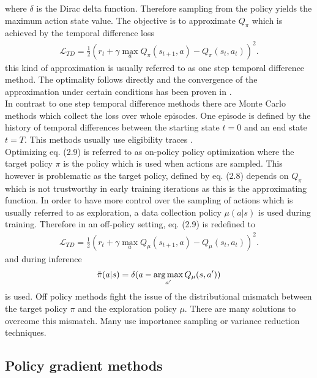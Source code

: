 where $\delta$ is the Dirac delta function. Therefore sampling from the policy yields the maximum action state value. The objective is to approximate $Q_{\pi}$ which is achieved by the temporal difference loss
\begin{align}
\mathcal{L}_{TD} = \frac{1}{2} \left(r_{t} + \gamma \max_{a}Q_{\pi}(s_{t+1}, a) - Q_{\pi}(s_t, a_t)\right)^2.
\end{align}
this kind of approximation is usually referred to as one step temporal difference method. The optimality follows directly and the convergence of the approximation under certain conditions has been proven in \cite{SBQL}.\\
In contrast to one step temporal difference methods there are Monte Carlo methods which collect the loss over whole episodes. One episode is defined by the history of temporal differences between the starting state $t=0$ and an end state $t=T$. This methods usually use eligibility traces \cite{SBeligibility}. \\
Optimizing eq. (2.9) is referred to as on-policy policy optimization where the target policy $\pi$ is the policy which is used when actions are sampled. This however is problematic as the target policy, defined by eq. (2.8) depends on $Q_{\pi}$ which is not trustworthy in early training iterations as this is the approximating function. In order to have more control over the sampling of actions which is usually referred to as exploration, a data collection policy $\mu(a|s)$ is used during training. Therefore in an off-policy setting, eq. (2.9) is redefined to
\begin{align}
\mathcal{L}_{TD} = \frac{1}{2} \left(r_{t} + \gamma \max_{a}Q_{\mu}(s_{t+1}, a) - Q_{\mu}(s_t, a_t)\right)^2\text{.}
\end{align}
and during inference 
\begin{align}
\bar{\pi}(a|s) = \delta(a - \operatorname*{arg\,max}_{a'}Q_{\mu}(s, a'))
\end{align}
is used. Off policy methods fight the issue of the distributional mismatch between the target policy $\pi$ and the exploration policy $\mu$. There are many solutions to overcome this mismatch. Many use importance sampling or variance reduction techniques.\cite{liu2018breaking}

\subsection{Policy gradient methods}


